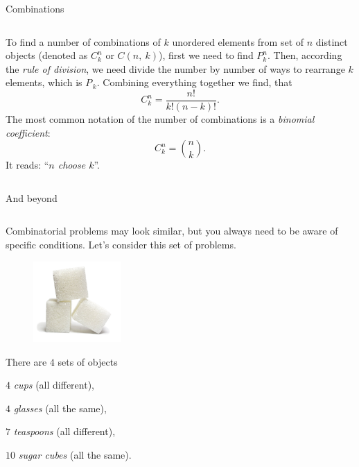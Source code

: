 \documentclass[9pt,aspectratio=169]{beamer}
\begin{document}
\begin{frame}{Combinations}
\begin{columns}[T]
\begin{column}{0.5\textwidth}
      To find a number of combinations of $k$ unordered elements from set of $n$ distinct objects (denoted as $C_k^n$ or $C(n,\ k)$), first we need to find $P_k^n$. Then, according the \emph{rule of division}, we need divide the number by number of ways to rearrange $k$ elements, which is $P_{\,k}$. Combining everything together we find, that
      \[
        C_k^n = \frac{n!}{k! (n-k)!}.
      \]
      The most common notation of the number of combinations is a \emph{binomial coefficient}:
      \[
        C_k^n = \binom{n}{k}.
      \]
      It reads: “\emph{$n$ choose $k$}”.

    \end{column}
  \end{columns}
\end{frame}

\begin{frame}{And beyond}
  \begin{columns}[T]
    \begin{column}{0.5\textwidth}
      Combinatorial problems may look similar, but you always need to be aware of specific conditions. Let's consider this set of problems.

      \begin{problem}%
        \begin{figure}%
          \vspace{-2em}
          \includegraphics[width=0.3\textwidth]{02 - Combinatorics 101/sugar.png}
        \end{figure}

        There are $4$ sets of objects

        \quad $4$ \emph{cups} (all different),

        \quad $4$ \emph{glasses} (all the same),

        \quad $7$ \emph{teaspoons} (all different),

        \quad $10$ \emph{sugar cubes} (all the same).


\end{problem}
\end{column}
\end{columns}
\end{frame}
\end{document}
